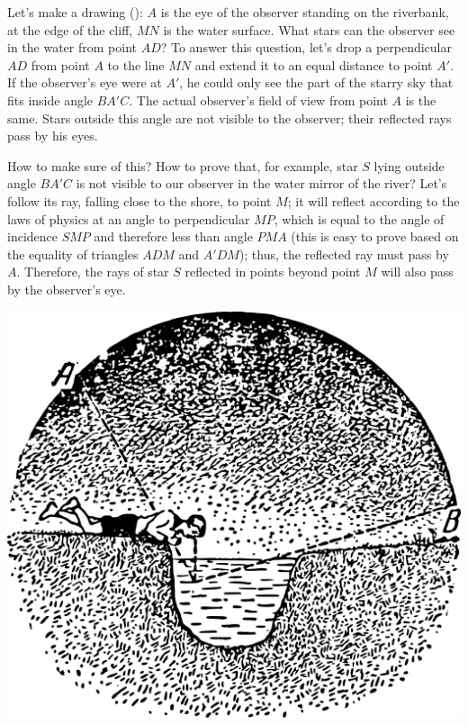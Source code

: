 Let's make a drawing (): $A$ is the eye of the observer standing on the riverbank, at the edge of the cliff, $MN$ is the water surface. What stars can the observer see in the water from point $AD$? To answer this question, let's drop a perpendicular $AD$ from point $A$ to the line $MN$ and extend it to an equal distance to point $A'$. If the observer's eye were at $A'$, he could only see the part of the starry sky that fits inside angle $BA'C$. The actual observer's field of view from point $A$ is the same. Stars outside this angle are not visible to the observer; their reflected rays pass by his eyes.

How to make sure of this? How to prove that, for example, star $S$ lying outside angle $BA'C$ is not visible to our observer in the water mirror of the river? Let's follow its ray, falling close to the shore, to point $M$; it will reflect according to the laws of physics at an angle to perpendicular $MP$, which is equal to the angle of incidence $SMP$ and therefore less than angle $PMA$ (this is easy to prove based on the equality of triangles $ADM$ and $A'DM$); thus, the reflected ray must pass by $A$. Therefore, the rays of star $S$ reflected in points beyond point $M$ will also pass by the observer's eye.

\begin{marginfigure}[1cm]%
\centering
\includegraphics[width=1.\textwidth]{figures/ch-02/fig-055.pdf}
\end{marginfigure}

